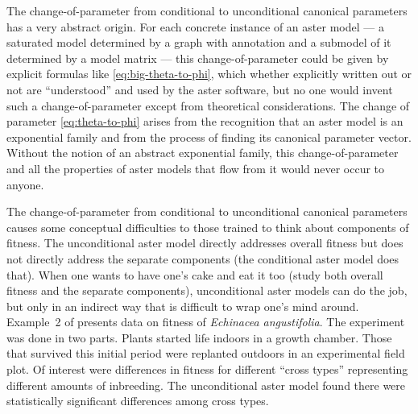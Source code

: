 \documentclass[11pt]{article}
\begin{document}
The change-of-parameter from conditional to unconditional canonical parameters
has a very abstract origin.  For each concrete instance of an aster model ---
a saturated model determined by a graph with annotation and a submodel of it
determined by a model matrix --- this change-of-parameter could be given
by explicit formulas like \eqref{eq:big-theta-to-phi}, which whether explicitly
written out or not are ``understood'' and used by the aster software,
but no one would invent such a change-of-parameter except from theoretical
considerations.  The change of parameter \eqref{eq:theta-to-phi} arises from
the recognition that an aster model is an exponential family and from
the process of finding its canonical parameter vector.
Without the notion of an abstract exponential family,
this change-of-parameter and all the properties of aster models that flow from
it would never occur to anyone.

The change-of-parameter from conditional to unconditional canonical parameters
causes some conceptual difficulties to those trained to think about components
of fitness.  The unconditional aster model directly addresses overall fitness
but does not directly address the separate components (the conditional aster
model does that).  When one wants to have one's cake and eat it too (study
both overall fitness and the separate components), unconditional aster models
can do the job, but only in an indirect way that is difficult to wrap one's
mind around.  Example~2 of \citet{aster2} presents data on fitness of
\emph{Echinacea angustifolia}.  The experiment was done in two parts.
Plants started life indoors in a growth chamber.  Those that survived this
initial period were replanted outdoors in an experimental field plot.
Of interest were differences in fitness for different ``cross types''
representing different amounts of inbreeding.  The unconditional aster model
found there were statistically significant differences among cross types.
\end{document}
